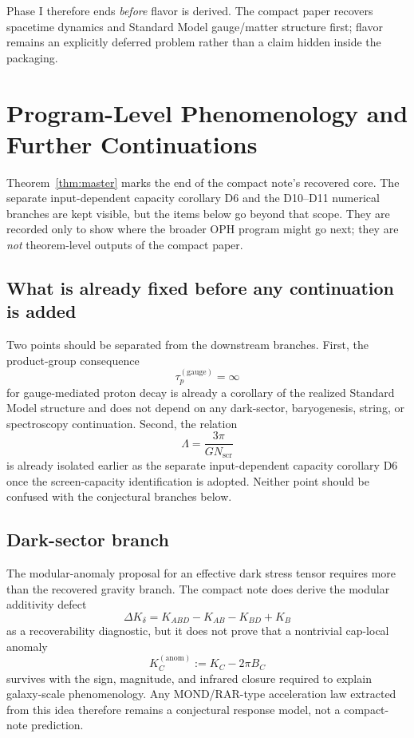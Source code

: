 \documentclass[11pt]{article}
\begin{document}
Phase I therefore ends \emph{before} flavor is derived. The compact paper recovers spacetime dynamics and Standard Model gauge/matter structure first; flavor remains an explicitly deferred problem rather than a claim hidden inside the packaging.

\section{Program-Level Phenomenology and Further Continuations}

Theorem~\ref{thm:master} marks the end of the compact note's recovered core. The separate input-dependent capacity corollary D6 and the D10--D11 numerical branches are kept visible, but the items below go beyond that scope. They are recorded only to show where the broader OPH program might go next; they are \emph{not} theorem-level outputs of the compact paper.

\subsection{What is already fixed before any continuation is added}

Two points should be separated from the downstream branches. First, the product-group consequence
\[
\tau_p^{(\mathrm{gauge})}=\infty
\]
for gauge-mediated proton decay is already a corollary of the realized Standard Model structure and does not depend on any dark-sector, baryogenesis, string, or spectroscopy continuation. Second, the relation
\[
\Lambda=\frac{3\pi}{G N_{\mathrm{scr}}}
\]
is already isolated earlier as the separate input-dependent capacity corollary D6 once the screen-capacity identification is adopted. Neither point should be confused with the conjectural branches below.

\subsection{Dark-sector branch}

The modular-anomaly proposal for an effective dark stress tensor requires more than the recovered gravity branch. The compact note does derive the modular additivity defect
\[
\Delta K_\delta = K_{ABD}-K_{AB}-K_{BD}+K_B
\]
as a recoverability diagnostic, but it does not prove that a nontrivial cap-local anomaly
\[
K_C^{(\mathrm{anom})}:=K_C-2\pi B_C
\]
survives with the sign, magnitude, and infrared closure required to explain galaxy-scale phenomenology. Any MOND/RAR-type acceleration law extracted from this idea therefore remains a conjectural response model, not a compact-note prediction.
\end{document}
